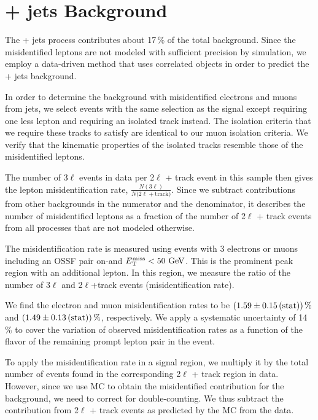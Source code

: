\section{\texorpdfstring{\Z}{Z} + jets Background}
\label{sec:bkg_fakeLight}

The \Z + jets process contributes about 17\,\% of the total background. Since the misidentified leptons are not modeled with sufficient precision by simulation, we employ a data-driven method that uses correlated objects in order to predict the \Z + jets background.

In order to determine the background with misidentified electrons and muons from jets, we select events with the same selection as the signal except requiring one less lepton and requiring an isolated track instead. The isolation criteria that we require these tracks to satisfy are identical to our muon isolation criteria. We verify that the kinematic properties of the isolated tracks resemble those of the misidentified leptons.

The number of 3$\ell$ events in data per 2$\ell$ + track event in this sample then gives the lepton misidentification rate, $\frac{N(3\ell)}{N(2\ell + \textrm{track)}}$. Since we subtract contributions from other backgrounds in the numerator and the denominator, it describes the number of misidentified leptons as a fraction of the number of 2$\ell$ + track events from all processes that are not modeled otherwise.

\label{sec:bkg_fakeLight/jets}
The misidentification rate is measured using events with 3 electrons or muons including an OSSF pair on-\Z and $E_{\mathrm{T}}^{\text{miss}} < 50\,\,\text{Ge\hspace{-.08em}V}$. This is the prominent \Z peak region with an additional lepton. In this region, we measure the ratio of the number of 3$\ell$ and 2$\ell$+track events (misidentification rate).

We find the electron and muon misidentification rates to be $(1.59 \pm 0.15\,\text{(stat)})\,\%$ and $(1.49 \pm 0.13\,\text{(stat)})\,\%$, respectively. We apply a systematic uncertainty of 14\,\% to cover the variation of observed misidentification rates as a function of the flavor of the remaining prompt lepton pair in the event.

To apply the misidentification rate in a signal region, we multiply it by the total number of events found in the corresponding 2$\ell$ + track region in data. However, since we use MC to obtain the misidentified contribution for the \ttbar background, we need to correct for double-counting. We thus subtract the contribution from 2$\ell$ + track events as predicted by the \ttbar MC from the data.


